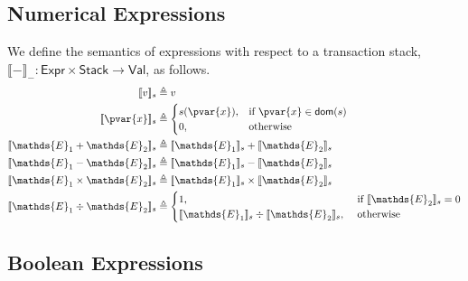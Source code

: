 \subsection{Numerical Expressions}

We define the semantics of expressions with respect to a transaction stack, $\llbracket - \rrbracket_- : \mathsf{Expr} \times \mathsf{Stack} \rightarrow \mathsf{Val}$, as follows.
\begin{align*}
\llbracket v \rrbracket_s &\triangleq v \\
\llbracket \pvar{x} \rrbracket_s &\triangleq
\begin{cases}
s(\pvar{x}), &\text{if } \pvar{x} \in \textsf{dom}(s)\\
0,&\text{otherwise}
\end{cases} \\
\llbracket \mathds{E}_1 + \mathds{E}_2 \rrbracket_s &\triangleq \llbracket \mathds{E}_1 \rrbracket_s + \llbracket \mathds{E}_2 \rrbracket_s \\
\llbracket \mathds{E}_1 - \mathds{E}_2 \rrbracket_s &\triangleq \llbracket \mathds{E}_1 \rrbracket_s - \llbracket \mathds{E}_2 \rrbracket_s \\
\llbracket \mathds{E}_1 \times \mathds{E}_2 \rrbracket_s &\triangleq \llbracket \mathds{E}_1 \rrbracket_s \times \llbracket \mathds{E}_2 \rrbracket_s \\
\llbracket \mathds{E}_1 \div \mathds{E}_2 \rrbracket_s &\triangleq 
\begin{cases}
1, &\text{ if } \llbracket \mathds{E}_2 \rrbracket_s = 0 \\
\llbracket \mathds{E}_1 \rrbracket_s \div \llbracket \mathds{E}_2 \rrbracket_s, &\text{ otherwise} \\
\end{cases}
\end{align*}

\subsection{Boolean Expressions}

